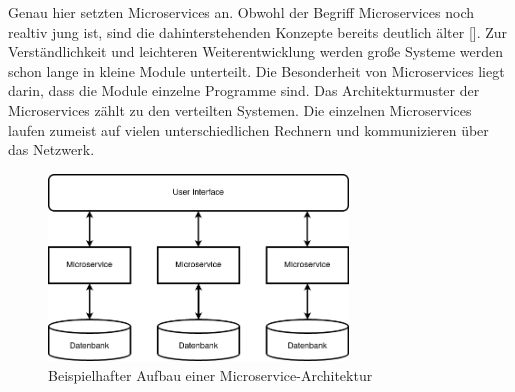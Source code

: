 Genau hier setzten Microservices an. Obwohl der Begriff Microservices noch realtiv jung ist, sind die dahinterstehenden Konzepte bereits deutlich älter [\cite[S. 15]{newmanMicroservices2015}]. Zur Verständlichkeit und leichteren Weiterentwicklung werden große Systeme werden schon lange in kleine Module unterteilt. Die Besonderheit von Microservices liegt darin, dass die Module einzelne Programme sind. Das Architekturmuster der Microservices zählt zu den verteilten Systemen. Die einzelnen Microservices laufen zumeist auf vielen unterschiedlichen Rechnern und kommunizieren über das Netzwerk.

\begin{figure}[H] 
    \centering
    \includegraphics[width=0.71\textwidth]{figures/Microservices.png}
    \caption{Beispielhafter Aufbau einer Microservice-Architektur}
\end{figure}

